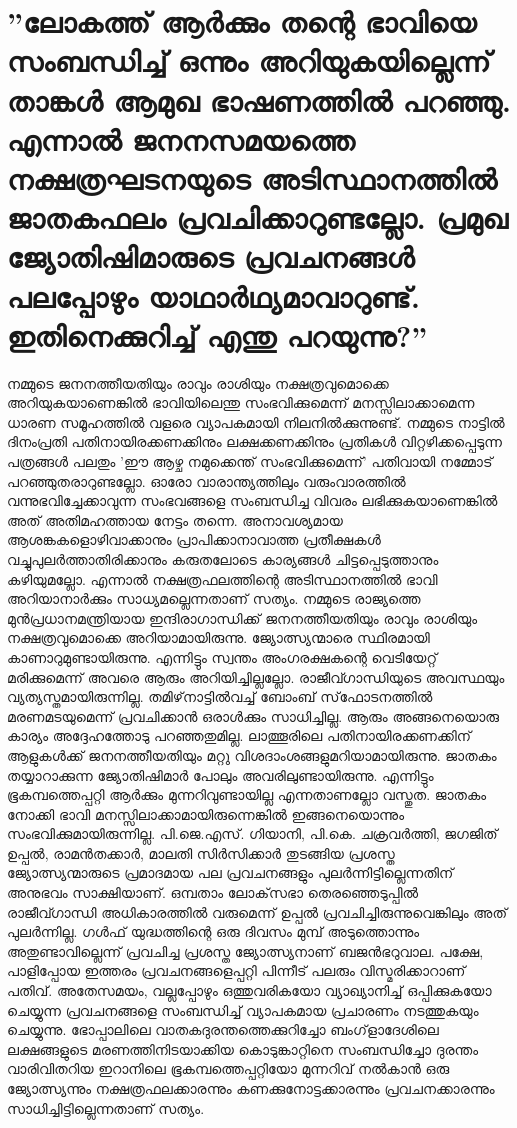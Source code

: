   \section{''ലോകത്ത് ആര്‍ക്കും തന്റെ ഭാവിയെ സംബന്ധിച്ച് ഒന്നും അറിയുകയില്ലെന്ന് താങ്കള്‍ ആമുഖ ഭാഷണത്തില്‍ പറഞ്ഞു. എന്നാല്‍ ജനനസമയത്തെ നക്ഷത്രഘടനയുടെ അടിസ്ഥാനത്തില്‍ ജാതകഫലം പ്രവചിക്കാറുണ്ടല്ലോ. പ്രമുഖ ജ്യോതിഷിമാരുടെ പ്രവചനങ്ങള്‍ പലപ്പോഴും യാഥാര്‍ഥ്യമാവാറുണ്ട്. ഇതിനെക്കുറിച്ച് എന്തു പറയുന്നു?''}
 നമ്മുടെ ജനനത്തീയതിയും രാവും രാശിയും നക്ഷത്രവുമൊക്കെ അറിയുകയാണെങ്കില്‍ ഭാവിയിലെന്തു സംഭവിക്കുമെന്ന് മനസ്സിലാക്കാമെന്ന ധാരണ സമൂഹത്തില്‍ വളരെ വ്യാപകമായി നിലനില്‍ക്കുന്നുണ്ട്. നമ്മുടെ നാട്ടില്‍ ദിനംപ്രതി പതിനായിരക്കണക്കിനും ലക്ഷക്കണക്കിനും പ്രതികള്‍ വിറ്റഴിക്കപ്പെടുന്ന പത്രങ്ങള്‍ പലതും 'ഈ ആഴ്ച നമുക്കെന്ത് സംഭവിക്കുമെന്ന്' പതിവായി നമ്മോട് പറഞ്ഞുതരാറുണ്ടല്ലോ. ഓരോ വാരാന്ത്യത്തിലും വരുംവാരത്തില്‍ വന്നുഭവിച്ചേക്കാവുന്ന സംഭവങ്ങളെ സംബന്ധിച്ച വിവരം ലഭിക്കുകയാണെങ്കില്‍ അത് അതിമഹത്തായ നേട്ടം തന്നെ. അനാവശ്യമായ ആശങ്കകളൊഴിവാക്കാനും പ്രാപിക്കാനാവാത്ത പ്രതീക്ഷകള്‍ വച്ചുപുലര്‍ത്താതിരിക്കാനും കരുതലോടെ കാര്യങ്ങള്‍ ചിട്ടപ്പെടുത്താനും കഴിയുമല്ലോ. എന്നാല്‍ നക്ഷത്രഫലത്തിന്റെ അടിസ്ഥാനത്തില്‍ ഭാവി അറിയാനാര്‍ക്കും സാധ്യമല്ലെന്നതാണ് സത്യം. നമ്മുടെ രാജ്യത്തെ മുന്‍പ്രധാനമന്ത്രിയായ ഇന്ദിരാഗാന്ധിക്ക് ജനനത്തീയതിയും രാവും രാശിയും നക്ഷത്രവുമൊക്കെ അറിയാമായിരുന്നു. ജ്യോത്സ്യന്മാരെ സ്ഥിരമായി കാണാറുമുണ്ടായിരുന്നു. എന്നിട്ടും സ്വന്തം അംഗരക്ഷകന്റെ വെടിയേറ്റ് മരിക്കുമെന്ന് അവരെ ആരും അറിയിച്ചില്ലല്ലോ. രാജീവ്ഗാന്ധിയുടെ അവസ്ഥയും വ്യത്യസ്തമായിരുന്നില്ല. തമിഴ്‌നാട്ടില്‍വച്ച് ബോംബ് സ്‌ഫോടനത്തില്‍ മരണമടയുമെന്ന് പ്രവചിക്കാന്‍ ഒരാള്‍ക്കും സാധിച്ചില്ല. ആരും അങ്ങനെയൊരു കാര്യം അദ്ദേഹത്തോടു പറഞ്ഞതുമില്ല. ലാത്തൂരിലെ പതിനായിരക്കണക്കിന് ആളുകള്‍ക്ക് ജനനത്തീയതിയും മറ്റു വിശദാംശങ്ങളുമറിയാമായിരുന്നു. ജാതകം തയ്യാറാക്കുന്ന ജ്യോതിഷിമാര്‍ പോലും അവരിലുണ്ടായിരുന്നു. എന്നിട്ടും ഭൂകമ്പത്തെപ്പറ്റി ആര്‍ക്കും മുന്നറിവുണ്ടായില്ല എന്നതാണല്ലോ വസ്തുത. ജാതകം നോക്കി ഭാവി മനസ്സിലാക്കാമായിരുന്നെങ്കില്‍ ഇങ്ങനെയൊന്നും സംഭവിക്കുമായിരുന്നില്ല.
പി.ജെ.എസ്. ഗിയാനി, പി.കെ. ചക്രവര്‍ത്തി, ജഗജിത് ഉപ്പല്‍, രാമന്‍തക്കാര്‍, മാലതി സിര്‍സിക്കാര്‍ തുടങ്ങിയ പ്രശസ്ത ജ്യോത്സ്യന്മാരുടെ പ്രമാദമായ പല പ്രവചനങ്ങളും പുലര്‍ന്നിട്ടില്ലെന്നതിന് അനുഭവം സാക്ഷിയാണ്. ഒമ്പതാം ലോക്‌സഭാ തെരഞ്ഞെടുപ്പില്‍ രാജീവ്ഗാന്ധി അധികാരത്തില്‍ വരുമെന്ന് ഉപ്പല്‍ പ്രവചിച്ചിരുന്നുവെങ്കിലും അത് പുലര്‍ന്നില്ല. ഗള്‍ഫ് യുദ്ധത്തിന്റെ ഒരു ദിവസം മുമ്പ് അടുത്തൊന്നും അതുണ്ടാവില്ലെന്ന് പ്രവചിച്ച പ്രശസ്ത ജ്യോത്സ്യനാണ് ബജന്‍ഭറുവാല. പക്ഷേ, പാളിപ്പോയ ഇത്തരം പ്രവചനങ്ങളെപ്പറ്റി പിന്നീട് പലരും വിസ്മരിക്കാറാണ് പതിവ്. അതേസമയം, വല്ലപ്പോഴും ഒത്തുവരികയോ വ്യാഖ്യാനിച്ച് ഒപ്പിക്കുകയോ ചെയ്യുന്ന പ്രവചനങ്ങളെ സംബന്ധിച്ച് വ്യാപകമായ പ്രചാരണം നടത്തുകയും ചെയ്യുന്നു. ഭോപ്പാലിലെ വാതകദുരന്തത്തെക്കുറിച്ചോ ബംഗ്‌ളാദേശിലെ ലക്ഷങ്ങളുടെ മരണത്തിനിടയാക്കിയ കൊടുങ്കാറ്റിനെ സംബന്ധിച്ചോ ദുരന്തം വാരിവിതറിയ ഇറാനിലെ ഭൂകമ്പത്തെപ്പറ്റിയോ മുന്നറിവ് നല്‍കാന്‍ ഒരു ജ്യോത്സ്യന്നും നക്ഷത്രഫലക്കാരന്നും കണക്കുനോട്ടക്കാരന്നും പ്രവചനക്കാരന്നും സാധിച്ചിട്ടില്ലെന്നതാണ് സത്യം.
